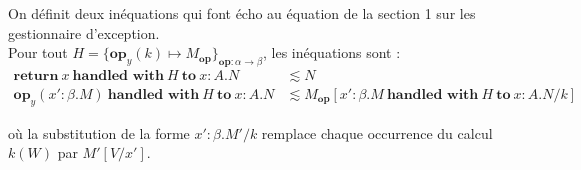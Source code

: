

On définit deux inéquations qui font écho au équation de la section 1 sur les gestionnaire d'exception.\\ 
Pour tout $H = \{\textbf{op}_y(k) \mapsto M_\textbf{op}\}_{\textbf{op}:\alpha \rightarrow \beta}$, les inéquations sont : 
\begin{align*}
	\textbf{return}~x~\textbf{handled~with}~H~\textbf{to}~x:A.N  &\lesssim N\\
	\textbf{op}_y(x':\beta.M)~\textbf{handled~with}~H~\textbf{to}~x:A.N&\lesssim M_\textbf{op}[x':\beta.M~\textbf{handled~with}~H~\textbf{to}~x:A.N/k]
\end{align*}
	
où la substitution de la forme $x':\beta.M'/k$ remplace chaque occurrence du calcul $k(W)$ par $M'[V/x']$.



